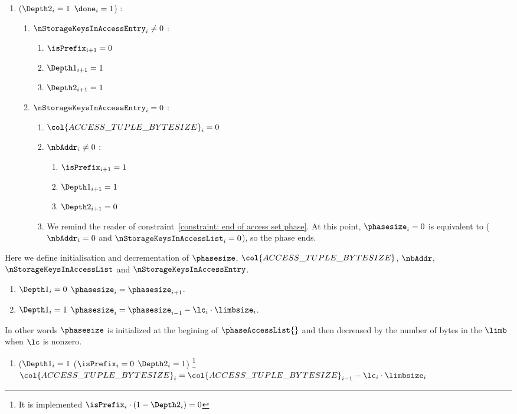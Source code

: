 \begin{enumerate}[resume]
	\item \If ($\Depth2_{i}=1$ \et $\done_{i}=1$) \Then:
		\begin{enumerate}
			\item \If $\nStorageKeysInAccessEntry_{i} \neq 0$ \Then:
				\begin{enumerate}
					\item $\isPrefix_{i+1}=0$  
					\item $\Depth1_{i+1}=1$ 
					\item $\Depth2_{i+1}=1$
				\end{enumerate}
			\item \If $\nStorageKeysInAccessEntry_{i}=0$ \Then:
				\begin{enumerate}
					\item $\col{ACCESS\_TUPLE\_BYTESIZE}_{i}=0$
					\item \If $\nbAddr_{i} \neq 0$ \Then:
						\begin{enumerate}
							\item $\isPrefix_{i+1}=1$
							\item $\Depth1_{i+1}=1$
							\item $\Depth2_{i+1}=0$
						\end{enumerate}
					\item \trash We remind the reader of constraint~\ref{constraint: end of access set phase}. At this point, $\phasesize_{i}=0$ is equivalent to ($\nbAddr_{i} = 0$ and $\nStorageKeysInAccessList_{i}=0$), so the phase ends.
				\end{enumerate} 
		\end{enumerate}
\end{enumerate}
Here we define initialisation and decrementation of $\phasesize$, $\col{ACCESS\_TUPLE\_BYTESIZE}$, $\nbAddr$, $\nStorageKeysInAccessList$ and $\nStorageKeysInAccessEntry$.
\begin{enumerate}[resume]
	\item \If $\Depth1_{i}=0$ \Then $\phasesize_{i} = \phasesize_{i+1}$.
	\item \If $\Depth1_{i}=1$ \Then $\phasesize_{i} = \phasesize_{i-1} - \lc_{i} \cdot \limbsize_{i}$. 
\end{enumerate}
In other words $\phasesize$ is initialized at the begining of $\phaseAccessList{}$ and then decreased by the number of bytes in the $\limb$ when $\lc$ is nonzero.
\begin{enumerate}[resume]

	\item \If ($\Depth1_{i}=1$ \et ($\isPrefix_{i}=0$ \Or $\Depth2_{i}=1$) \footnote{It is implemented \If $\isPrefix_{i} \cdot (1 - \Depth2_{i})=0$ \Then} \Then $\col{ACCESS\_TUPLE\_BYTESIZE}_{i}=\col{ACCESS\_TUPLE\_BYTESIZE}_{i-1} - \lc_{i} \cdot \limbsize_{i}$

\end{enumerate}
